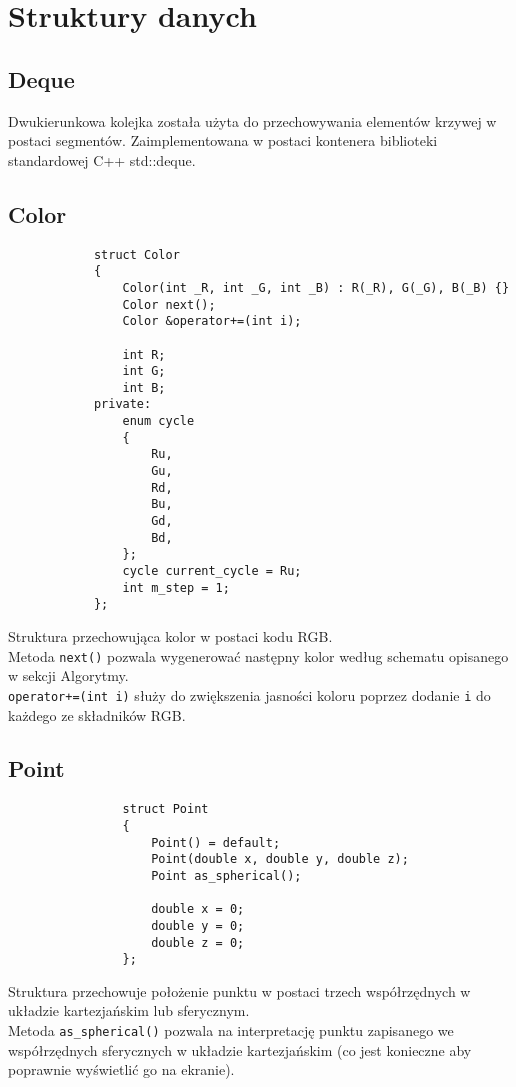 


	\section{Struktury danych}
		\subsection{Deque}
			Dwukierunkowa kolejka została użyta do przechowywania elementów krzywej w postaci segmentów.
			Zaimplementowana w postaci kontenera biblioteki standardowej C++ std::deque.
		\subsection{Color}
			\begin{lstlisting}
			struct Color
			{
			    Color(int _R, int _G, int _B) : R(_R), G(_G), B(_B) {}
			    Color next();
			    Color &operator+=(int i);
			
			    int R;
			    int G;
			    int B;
			private:
			    enum cycle
			    {
			        Ru,
			        Gu,
			        Rd,
			        Bu,
			        Gd,
			        Bd,
			    };
			    cycle current_cycle = Ru;
			    int m_step = 1;
			};
			\end{lstlisting}
			Struktura przechowująca kolor w postaci kodu RGB.\\
			Metoda \lstinline|next()| pozwala wygenerować następny kolor według schematu opisanego w sekcji Algorytmy.\\
			\lstinline|operator+=(int i)| służy do zwiększenia jasności koloru poprzez dodanie \lstinline|i| do każdego ze składników RGB.
		\subsection{Point}
			\begin{lstlisting}
				struct Point
				{
				    Point() = default;
				    Point(double x, double y, double z);
				    Point as_spherical();

				    double x = 0;
				    double y = 0;
				    double z = 0;
				};
			\end{lstlisting}
			Struktura przechowuje położenie punktu w postaci trzech współrzędnych w układzie kartezjańskim lub sferycznym.\\
			Metoda \lstinline|as_spherical()| pozwala na interpretację punktu zapisanego we współrzędnych sferycznych w układzie kartezjańskim (co jest konieczne aby poprawnie wyświetlić go na ekranie).

